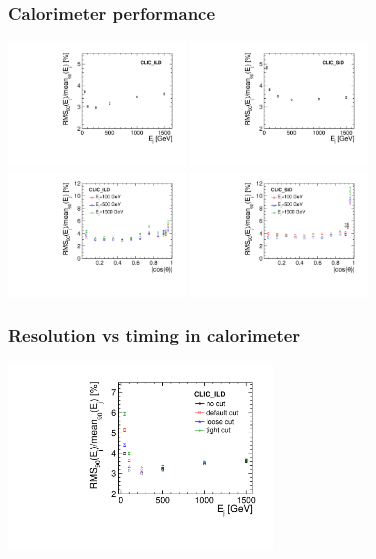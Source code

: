 \documentclass{beamer}
\begin{document}
\begin{frame}
\frametitle{Calorimeter performance}
\begin{center}
\includegraphics[width=4.7cm]{Eres_vsE_ILD.pdf}
\includegraphics[width=4.7cm]{Eres_vsE_SID.pdf}\\
\includegraphics[width=4.7cm]{Eres_vsThetaStripped_ILD.pdf}
\includegraphics[width=4.7cm]{Eres_vsThetaStripped_SID.pdf}
\end{center}
\end{frame}
\begin{frame}
\frametitle{Resolution vs timing in calorimeter}
\begin{center}
\includegraphics[width=7cm]{Eres_Timing_ILD.pdf}
\end{center}
\end{frame}
\end{document}
